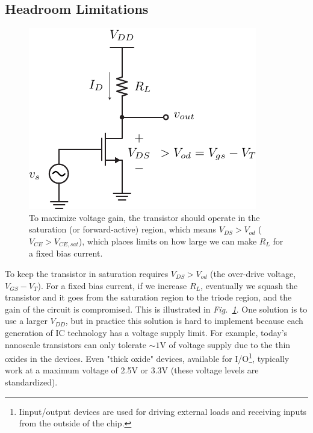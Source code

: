 \subsection{Headroom Limitations}
\begin{figure}[tb]
\centering
\includegraphics[scale=1]{1cs_headroom.pdf}
\caption{To maximize voltage gain, the transistor should operate in the saturation (or forward-active) region, which means $V_{DS} > V_{od}$ ($V_{CE} > V_{CE,sat}$), which places limits on how large we can make $R_L$ for a fixed bias current.}
\label{fig:1cs_headroom.pdf}
\end{figure}
To keep the transistor in saturation requires $V_{DS} > V_{od}$ (the over-drive voltage, $V_{GS} - V_T$).  For a fixed bias current, if we increase $R_L$, eventually we squash the transistor and it goes from the saturation region to the triode region, and the gain of the circuit is compromised.  This is illustrated in \emph{Fig.~\ref{fig:1cs_headroom.pdf}}.  One solution is to use a larger $V_{DD}$, but in practice this solution is hard to implement because each generation of IC technology has a voltage supply limit.  For example, today's nanoscale transistors can only tolerate $\sim 1$V of voltage supply due to the thin oxides in the devices.  Even "thick oxide" devices, available for I/O\footnote{Iinput/output devices are used for driving external loads and receiving inputs from the outside of the chip.}, typically work at a maximum voltage of 2.5V or 3.3V (these voltage levels are standardized).
